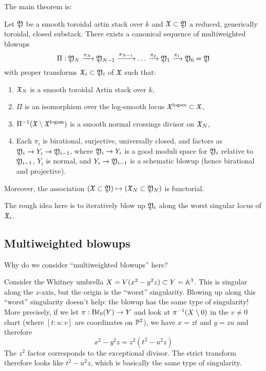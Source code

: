 \documentclass{amsart}
\begin{document}
The main theorem is:

\begin{thm}
	Let $\Yfr$ be a smooth toroidal artin stack over $k$ and $\Xfr \subset \Yfr$ a reduced, generically toroidal, closed substack.
	There exists a canonical sequence of multiweighted blowups
	\[
		\Pi: \Yfr_N \xrightarrow{\pi_N} \Yfr_{N-1} \xrightarrow{\pi_{N-1}} \dots \xrightarrow{\pi_2} \Yfr_1 \xrightarrow{\pi_1} \Yfr_0 = \Yfr
	\]
	with proper transforms $\Xfr_i \subset \Yfr_i$ of $\Xfr$ such that:
	\begin{enumerate}[label=(\roman*)]
		\item $\Xfr_N$ is a smooth toroidal Artin stack over $k$,
		\item $\Pi$ is an isomorphism over the log-smooth locus $\Xfr^{\mathrm{logsm}} \subset \Xfr$,
		\item $\Pi\inv(\Xfr \setminus \Xfr^{\mathrm{logsm}})$ is a smooth normal crossings divisor on $\Xfr_N$,
		\item Each $\pi_i$ is birational, surjective, universally closed, and factors as $\Yfr_i \to Y_i \to \Yfr_{i-1}$, where $\Yfr_i \to Y_i$ is a good moduli space for $\Yfr_i$ relative to $\Yfr_{i-1}$, $Y_i$ is normal, and $Y_i \to \Yfr_{i-1}$ is a schematic blowup (hence birational and projective).
	\end{enumerate}
	Moreover, the association $(\Xfr \subset \Yfr) \mapsto (\Xfr_N \subset \Yfr_N)$ is functorial.
\end{thm}

The rough idea here is to iteratively blow up $\Yfr_i$ along the worst singular locus of $\Xfr_i$.

\subsection{Multiweighted blowups}

Why do we consider ``multiweighted blowups'' here?

\begin{ex}
	Consider the Whitney umbrella $X = V(x^2 - y^2 z) \subset Y = \AA^3$.
	This is singular along the $z$-axis, but the origin is the ``worst'' singularity.
	Blowing up along this ``worst'' singularity doesn't help: the blowup has the same type of singularity!
	More precisely, if we let $\pi: \Bl_0(Y) \to Y$ and look at $\pi\inv(X \setminus 0)$ in the $v \neq 0$ chart (where $[t : u : v]$ are coordinates on $\PP^2$), we have $x = zt$ and $y = zu$ and therefore
	\[
		x^2 - y^2 z = z^2 (t^2 - u^2 z)
	\]
	The $z^2$ factor corresponds to the exceptional divisor.
	The strict transform therefore looks like $t^2 - u^2 z$, which is basically the same type of singularity.
\end{ex}
\end{document}
